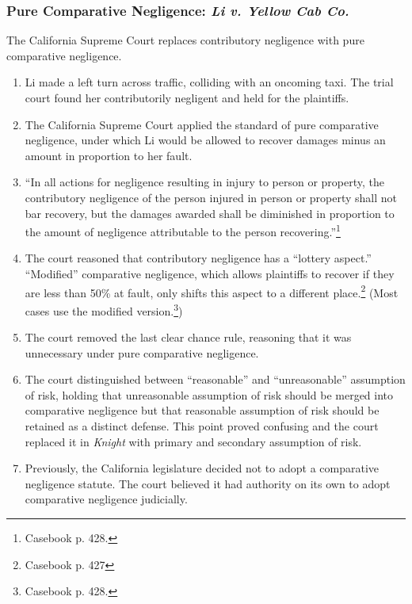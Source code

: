 \subsubsection{Pure Comparative Negligence: \emph{Li v. Yellow Cab Co.}}

The California Supreme Court replaces contributory negligence with pure 
comparative negligence.

\begin{enumerate}
    \item Li made a left turn across traffic, colliding with an oncoming taxi. 
    The trial court found her contributorily negligent and held for the 
    plaintiffs.
    \item The California Supreme Court applied the standard of pure 
    comparative negligence, under which Li would be allowed to recover damages 
    minus an amount in proportion to her fault.
    \item ``In all actions for negligence resulting in injury to person or 
    property, the contributory negligence of the person injured in person or 
    property shall not bar recovery, but the damages awarded shall be 
    diminished in proportion to the amount of negligence attributable to the 
    person recovering.''\footnote{Casebook p. 428.}
    \item The court reasoned that contributory negligence has a ``lottery aspect.'' ``Modified'' comparative negligence, which allows plaintiffs to recover if they are less than 50\% at fault, only shifts this aspect to a different place.\footnote{Casebook p. 427} (Most cases use the modified version.\footnote{Casebook p. 428.})
    \item The court removed the last clear chance rule, reasoning that it was 
    unnecessary under pure comparative negligence.
    \item The court distinguished between ``reasonable'' and ``unreasonable'' 
    assumption of risk, holding that unreasonable assumption of risk should be merged 
    into comparative negligence but that reasonable assumption of risk should 
    be retained as a distinct defense. This point proved confusing and the 
    court replaced it in \emph{Knight} with primary and secondary assumption 
    of risk.
    \item Previously, the California legislature decided not to adopt a 
    comparative negligence statute. The court believed it had authority on its 
    own to adopt comparative negligence judicially.
\end{enumerate}

